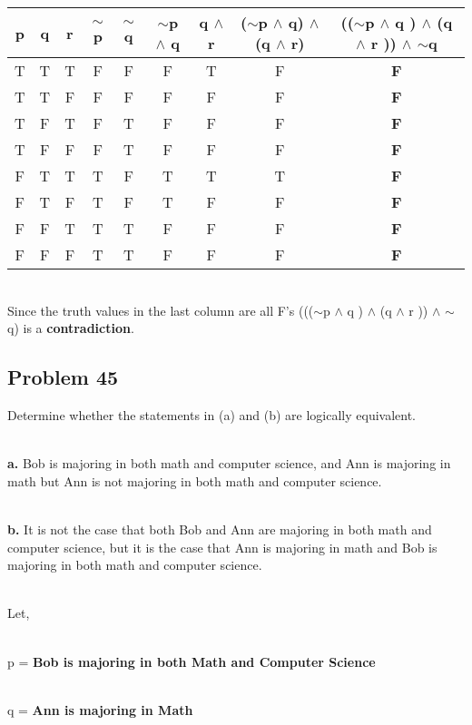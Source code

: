\documentclass{article}
\begin{document}
\begin{center}
	\begin{tabular}{ |c|c|c|c|c|c|c|c|c| } 
		\hline
		p & q & r & $\sim$p & $\sim$q & $\sim$p $\wedge$ q & q $\wedge$ r & ($\sim$p $\wedge$ q) $\wedge$ (q $\wedge$ r)  & (($\sim$p $\wedge$ q ) $\wedge$ (q $\wedge$ r )) $\wedge$ $\sim$q \\ 
		\hline
		T & T & T & F & F & F & T & F & \textbf{F} \\ 
		T & T & F & F & F & F & F & F & \textbf{F} \\ 
		T & F & T & F & T & F & F & F & \textbf{F} \\ 
		T & F & F & F & T & F & F & F & \textbf{F} \\ 
		F & T & T & T & F & T & T & T & \textbf{F} \\ 
		F & T & F & T & F & T & F & F & \textbf{F} \\ 
		F & F & T & T & T & F & F & F & \textbf{F} \\ 
		F & F & F & T & T & F & F & F & \textbf{F} \\ 
		\hline
	\end{tabular}
	\end{center}
\\ Since the truth values in the last column are all F’s ((($\sim$p $\wedge$ q ) $\wedge$ (q $\wedge$ r )) $\wedge$ $\sim$q) is a \textbf{contradiction}.

\subsection*{Problem 45}
Determine whether the statements in (a) and (b) are logically equivalent.

\\ \textbf{a.} Bob is majoring in both math and computer science, and Ann is majoring in math but Ann is not majoring in both math and computer science.

\\ \textbf{b.} It is not the case that both Bob and Ann are majoring in both math and computer science, but it is the case that Ann is majoring in math and Bob is majoring in both math and computer science. 

\par
\\ Let,

\\ p = \textbf{Bob is majoring in both Math and Computer Science} 

\\ q = \textbf{Ann is majoring in Math} 
\end{document}
